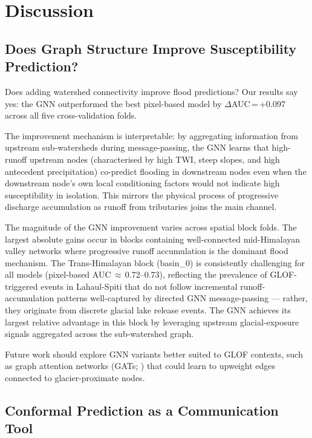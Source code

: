 \section{Discussion}
\label{sec:discussion}

\subsection{Does Graph Structure Improve Susceptibility Prediction?}
\label{sec:disc_gnn}

Does adding watershed connectivity improve flood predictions?
Our results say yes: the GNN outperformed the best pixel-based model
by $\Delta$AUC\,=\,+0.097 across all five cross-validation folds.

The improvement mechanism is interpretable:
by aggregating information from upstream sub-watersheds during message-passing,
the GNN learns that high-runoff upstream nodes
(characterised by high TWI, steep slopes, and high antecedent precipitation)
co-predict flooding in downstream nodes even when the downstream node's
own local conditioning factors would not indicate high susceptibility in isolation.
This mirrors the physical process of progressive discharge accumulation
as runoff from tributaries joins the main channel.

The magnitude of the GNN improvement varies across spatial block folds.
The largest absolute gains occur in blocks containing well-connected mid-Himalayan
valley networks where progressive runoff accumulation is the dominant flood mechanism.
The Trans-Himalayan block (basin\_0) is consistently challenging for all models
(pixel-based AUC\,$\approx$\,0.72--0.73),
reflecting the prevalence of GLOF-triggered events in Lahaul-Spiti that do not
follow incremental runoff-accumulation patterns well-captured by directed GNN
message-passing --- rather, they originate from discrete glacial lake release events.
The GNN achieves its largest relative advantage in this block
by leveraging upstream glacial-exposure signals aggregated across the sub-watershed graph.

Future work should explore GNN variants better suited to GLOF contexts,
such as graph attention networks (GATs; \citealt{velickovic2018gat})
that could learn to upweight edges connected to glacier-proximate nodes.

\subsection{Conformal Prediction as a Communication Tool}
\label{sec:disc_conformal}

